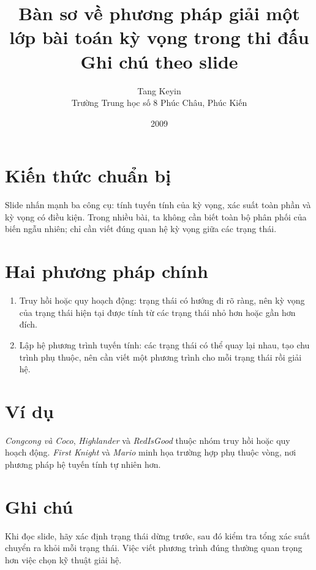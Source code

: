 \documentclass[11pt]{article}
\title{Bàn sơ về phương pháp giải một lớp bài toán kỳ vọng trong thi đấu\\{\large Ghi chú theo slide}}
\author{Tang Keyin\\Trường Trung học số 8 Phúc Châu, Phúc Kiến}
\date{2009}
\begin{document}
\maketitle


\section{Kiến thức chuẩn bị}

Slide nhấn mạnh ba công cụ: tính tuyến tính của kỳ vọng, xác suất toàn phần và
kỳ vọng có điều kiện. Trong nhiều bài, ta không cần biết toàn bộ phân phối của
biến ngẫu nhiên; chỉ cần viết đúng quan hệ kỳ vọng giữa các trạng thái.

\section{Hai phương pháp chính}

\begin{enumerate}
  \item Truy hồi hoặc quy hoạch động: trạng thái có hướng đi rõ ràng, nên kỳ
  vọng của trạng thái hiện tại được tính từ các trạng thái nhỏ hơn hoặc gần
  hơn đích.
  \item Lập hệ phương trình tuyến tính: các trạng thái có thể quay lại nhau,
  tạo chu trình phụ thuộc, nên cần viết một phương trình cho mỗi trạng thái
  rồi giải hệ.
\end{enumerate}

\section{Ví dụ}

\textit{Congcong và Coco}, \textit{Highlander} và \textit{RedIsGood} thuộc
nhóm truy hồi hoặc quy hoạch động. \textit{First Knight} và \textit{Mario}
minh họa trường hợp phụ thuộc vòng, nơi phương pháp hệ tuyến tính tự nhiên
hơn.

\section{Ghi chú}

Khi đọc slide, hãy xác định trạng thái dừng trước, sau đó kiểm tra tổng xác
suất chuyển ra khỏi mỗi trạng thái. Việc viết phương trình đúng thường quan
trọng hơn việc chọn kỹ thuật giải hệ.
\end{document}
